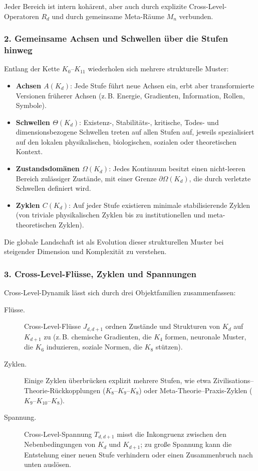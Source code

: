Jeder Bereich ist intern kohärent, aber auch durch explizite Cross-Level-Operatoren
$R_d$ und durch gemeinsame Meta-Räume $M_n$ verbunden.

\subsubsection{2. Gemeinsame Achsen und Schwellen über die Stufen hinweg}

Entlang der Kette $K_0$--$K_{11}$ wiederholen sich mehrere strukturelle Muster:
\begin{itemize}
  \item \textbf{Achsen $A(K_d)$}: Jede Stufe führt neue Achsen ein, erbt aber
        transformierte Versionen früherer Achsen (z.\,B. Energie, Gradienten,
        Information, Rollen, Symbole).
  \item \textbf{Schwellen $\Theta(K_d)$}: Existenz-, Stabilitäts-, kritische,
        Todes- und dimensionsbezogene Schwellen treten auf allen Stufen auf,
        jeweils spezialisiert auf den lokalen physikalischen, biologischen,
        sozialen oder theoretischen Kontext.
  \item \textbf{Zustandsdomänen $\Omega(K_d)$}: Jedes Kontinuum besitzt einen
        nicht-leeren Bereich zulässiger Zustände, mit einer Grenze
        $\partial\Omega(K_d)$, die durch verletzte Schwellen definiert wird.
  \item \textbf{Zyklen $C(K_d)$}: Auf jeder Stufe existieren minimale
        stabilisierende Zyklen (von triviale physikalischen Zyklen bis zu
        institutionellen und meta-theoretischen Zyklen).
\end{itemize}

Die globale Landschaft ist als Evolution dieser strukturellen Muster bei steigender
Dimension und Komplexität zu verstehen.

\subsubsection{3. Cross-Level-Flüsse, Zyklen und Spannungen}

Cross-Level-Dynamik lässt sich durch drei Objektfamilien zusammenfassen:
\begin{description}
  \item[Flüsse.] Cross-Level-Flüsse $J_{d,d+1}$ ordnen Zustände und Strukturen
        von $K_d$ auf $K_{d+1}$ zu (z.\,B. chemische Gradienten, die $K_4$
        formen, neuronale Muster, die $K_6$ induzieren, soziale Normen, die
        $K_8$ stützen).
  \item[Zyklen.] Einige Zyklen überbrücken explizit mehrere Stufen, wie etwa
        Zivilisations--Theorie-Rückkopplungen ($K_8$--$K_9$--$K_8$) oder
        Meta-Theorie--Praxis-Zyklen ($K_9$--$K_{10}$--$K_8$).
  \item[Spannung.] Cross-Level-Spannung $T_{d,d+1}$ misst die Inkongruenz
        zwischen den Nebenbedingungen von $K_d$ und $K_{d+1}$; zu große Spannung
        kann die Entstehung einer neuen Stufe verhindern oder einen Zusammenbruch
        nach unten auslösen.
\end{description}

